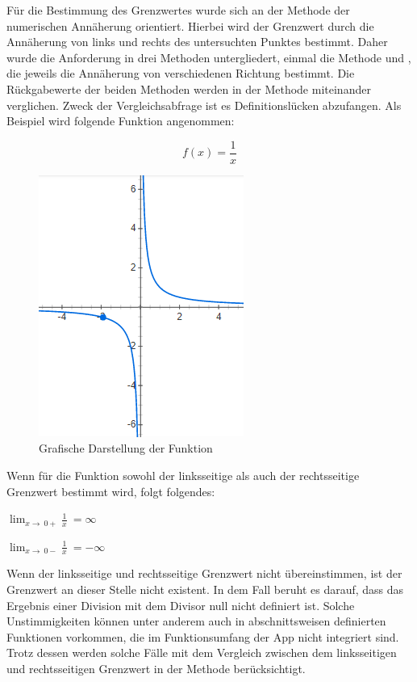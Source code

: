 Für die Bestimmung des Grenzwertes wurde sich an der Methode der numerischen Annäherung orientiert. Hierbei wird der Grenzwert durch die Annäherung von links und rechts des untersuchten Punktes bestimmt. Daher wurde die Anforderung in drei Methoden untergliedert, einmal die Methode  und , die jeweils die Annäherung von verschiedenen Richtung bestimmt. Die Rückgabewerte der beiden Methoden werden in der Methode  miteinander verglichen. Zweck der Vergleichsabfrage ist es Definitionslücken abzufangen. Als Beispiel wird folgende Funktion angenommen:

\[f(x) = \frac{1}{x}\]

\begin{figure}[!h]
	\includegraphics[scale=1]{img/funktion-grafik}
	\caption[Grafische Darstellung der Funktion]{Grafische Darstellung der Funktion\footnotemark}
\end{figure}

Wenn für die Funktion sowohl der linksseitige als auch der rechtsseitige Grenzwert bestimmt wird, folgt folgendes:  

$\lim_{x\to\ 0+} \frac{1}{x}\ = \infty$

$\lim_{x\to\ 0-} \frac{1}{x}\ = - \infty$


Wenn der linksseitige und rechtsseitige Grenzwert nicht übereinstimmen, ist der Grenzwert an dieser Stelle nicht existent. In dem Fall beruht es darauf, dass das Ergebnis einer Division mit dem Divisor null nicht definiert ist. Solche Unstimmigkeiten können unter anderem auch in abschnittsweisen definierten Funktionen vorkommen, die im Funktionsumfang der App nicht integriert sind. Trotz dessen werden solche Fälle mit dem Vergleich zwischen dem linksseitigen und rechtsseitigen Grenzwert in der Methode  berücksichtigt.

